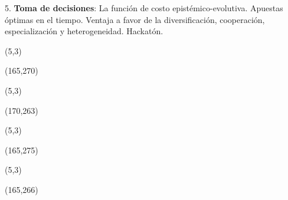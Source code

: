 \documentclass[a4paper,12pt]{article}
\begin{document}
\hspace{0.6cm} 5. \textbf{Toma de decisiones}: La función de costo epistémico-evolutiva. Apuestas óptimas en el tiempo. Ventaja a favor de la diversificación, cooperación, especialización y heterogeneidad. Hackatón.

\newpage

%
%
%
%
%



\phantom{.}
\begin{textblock}{60}(5,3) \centering
{}
\end{textblock}
\begin{textblock}{40}(165,270) \centering
{}
\end{textblock}




\newpage


\phantom{.}
\begin{textblock}{60}(5,3) \centering
{}
\end{textblock}
\begin{textblock}{35}(170,263) \centering
{}
\end{textblock}

\newpage

\phantom{.}
\begin{textblock}{60}(5,3) \centering
{}
\end{textblock}
\begin{textblock}{45}(165,275) \centering
{}
\end{textblock}

\newpage


\phantom{.}
\begin{textblock}{60}(5,3) \centering
{}
\end{textblock}
\begin{textblock}{40}(165,266) \centering
{}
\end{textblock}
\end{document}
